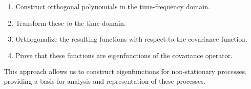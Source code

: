 \documentclass{article}
\begin{document}
\begin{enumerate}
\item Construct orthogonal polynomials in the time-frequency domain.
\item Transform these to the time domain.
\item Orthogonalize the resulting functions with respect to the covariance function.
\item Prove that these functions are eigenfunctions of the covariance operator.
\end{enumerate}

This approach allows us to construct eigenfunctions for non-stationary processes, providing a basis for analysis and representation of these processes.
\end{document}
